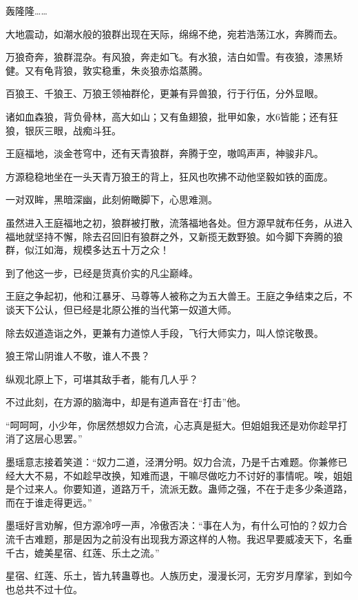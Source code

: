 
\begin{this_body}



轰隆隆……

大地震动，如潮水般的狼群出现在天际，绵绵不绝，宛若浩荡江水，奔腾而去。

万狼奇奔，狼群混杂。有风狼，奔走如飞。有水狼，洁白如雪。有夜狼，漆黑矫健。又有龟背狼，敦实稳重，朱炎狼赤焰蒸腾。

百狼王、千狼王、万狼王领袖群伦，更兼有异兽狼，行于行伍，分外显眼。

诸如血森狼，背负骨林，高大如山；又有鱼翅狼，批甲如象，水6皆能；还有狂狼，银灰三眼，战痴斗狂。

王庭福地，淡金苍穹中，还有天青狼群，奔腾于空，嗷鸣声声，神骏非凡。

方源稳稳地坐在一头天青万狼王的背上，狂风也吹拂不动他坚毅如铁的面庞。

一对双眸，黑暗深幽，此刻俯瞰脚下，心思难测。

虽然进入王庭福地之初，狼群被打散，流落福地各处。但方源早就布任务，从进入福地就坚持不懈，除去召回旧有狼群之外，又新揽无数野狼。如今脚下奔腾的狼群，似江如海，规模多达五十万之众！

到了他这一步，已经是货真价实的凡尘巅峰。

王庭之争起初，他和江暴牙、马尊等人被称之为五大兽王。王庭之争结束之后，不谈天下公认，但已经是北原公推的当代第一奴道大师。

除去奴道造诣之外，更兼有力道惊人手段，飞行大师实力，叫人惊诧敬畏。

狼王常山阴谁人不敬，谁人不畏？

纵观北原上下，可堪其敌手者，能有几人乎？

不过此刻，在方源的脑海中，却是有道声音在“打击”他。

“呵呵呵，小少年，你居然想奴力合流，心志真是挺大。但姐姐我还是劝你趁早打消了这层心思罢。”

墨瑶意志接着笑道：“奴力二道，泾渭分明。奴力合流，乃是千古难题。你兼修已经大大不易，不如趁早改换，知难而退，干嘛尽做吃力不讨好的事情呢。唉，姐姐是个过来人。你要知道，道路万千，流派无数。蛊师之强，不在于走多少条道路，而在于谁走得更远。”

墨瑶好言劝解，但方源冷哼一声，冷傲否决：“事在人为，有什么可怕的？奴力合流千古难题，那是因为之前没有出现我方源这样的人物。我迟早要威凌天下，名垂千古，媲美星宿、红莲、乐土之流。”

星宿、红莲、乐土，皆九转蛊尊也。人族历史，漫漫长河，无穷岁月摩挲，到如今也总共不过十位。


\end{this_body}
